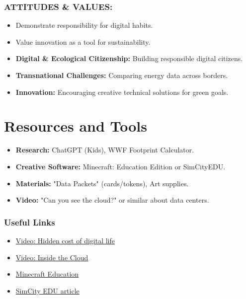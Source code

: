 \documentclass[11pt, a4paper]{article}
\begin{document}
\subsubsection*{ATTITUDES \& VALUES:}
\begin{itemize}
    \item Demonstrate responsibility for digital habits.
    \item Value innovation as a tool for sustainability.
\end{itemize}

\begin{eurobox}
\begin{itemize}
    \item \textbf{Digital \& Ecological Citizenship:} Building responsible digital citizens.
    \item \textbf{Transnational Challenges:} Comparing energy data across borders.
    \item \textbf{Innovation:} Encouraging creative technical solutions for green goals.
\end{itemize}
\end{eurobox}

\newpage
\section{Resources and Tools}
\begin{itemize}
    \item \textbf{Research:} ChatGPT (Kids), WWF Footprint Calculator.
    \item \textbf{Creative Software:} Minecraft: Education Edition or SimCityEDU.
    \item \textbf{Materials:} "Data Packets" (cards/tokens), Art supplies.
    \item \textbf{Video:} "Can you see the cloud?" or similar about data centers.
\end{itemize}

\subsubsection*{Useful Links}
\begin{itemize}
    \item \href{https://www.youtube.com/watch?v=-sNKfRq1oKg}{Video: Hidden cost of digital life}
    \item \href{https://www.youtube.com/watch?v=iVdTBlg5XWM}{Video: Inside the Cloud}
    \item \href{https://education.minecraft.net/en-us}{Minecraft Education}
    \item \href{https://learnjam.com/simcityedu-learning-what-games-can-do/}{SimCity EDU article}
\end{itemize}
\end{document}
